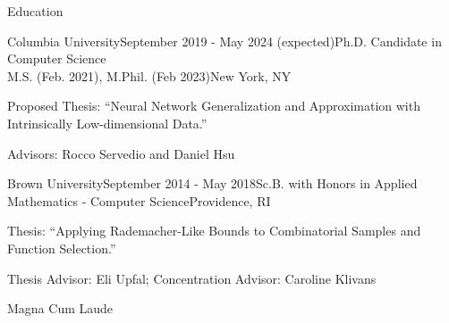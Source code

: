 \documentclass{cv} %
\begin{document}

\begin{rSection}{Education}

\begin{rSubsection}{Columbia University}{September 2019 - May 2024 (expected)}{Ph.D. Candidate in Computer Science \\ M.S. (Feb. 2021), M.Phil. (Feb 2023)}{New York, NY}
\item Proposed Thesis: ``Neural Network Generalization and Approximation with Intrinsically Low-dimensional Data.''
\item Advisors: Rocco Servedio and Daniel Hsu
\end{rSubsection}

\begin{rSubsection}{Brown University}{September 2014 - May 2018}{Sc.B. with Honors in Applied Mathematics - Computer Science}{Providence, RI}
\item Thesis: ``Applying Rademacher-Like Bounds to Combinatorial Samples and Function Selection.''
\item Thesis Advisor: Eli Upfal; Concentration Advisor: Caroline Klivans
\item Magna Cum Laude
\end{rSubsection}

\end{rSection}




\end{document}
